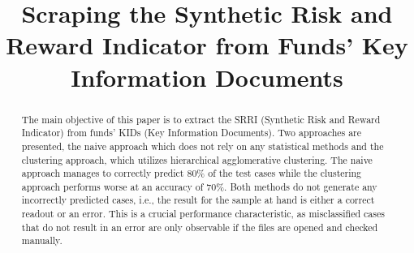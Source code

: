 \documentclass[aodsor,preprint]{imsart}
\numberwithin{equation}{section}
\theoremstyle{plain}
\begin{document}
\begin{frontmatter}
\title{Scraping the Synthetic Risk and Reward Indicator from Funds' Key Information Documents}

\begin{aug}
\author{ \snm{}}





\end{aug}

\begin{abstract}
The main objective of this paper is to extract the SRRI (Synthetic Risk and Reward Indicator) from funds' KIDs (Key Information Documents). Two approaches are presented, the naive approach which does not rely on any statistical methods and the clustering approach, which utilizes hierarchical agglomerative clustering. The naive approach manages to correctly predict 80\% of the test cases while the clustering approach performs worse at an accuracy of 70\%. Both methods do not generate any incorrectly predicted cases, i.e., the result for the sample at hand is either a correct readout or an error. This is a crucial performance characteristic, as misclassified cases that do not result in an error are only observable if the files are opened and checked manually.
\end{abstract}

\begin{keyword}[class=MSC]
\end{keyword}

\begin{keyword}
\kwd{\LaTeXe}
\end{keyword}

\end{frontmatter}
\end{document}

